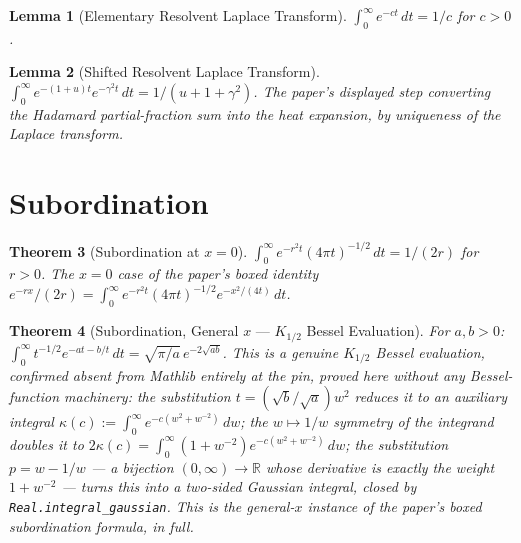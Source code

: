 \documentclass{report}
\newtheorem{theorem}{Theorem}[chapter]
\newtheorem{lemma}[theorem]{Lemma}
\theoremstyle{definition}
\begin{document}
\begin{lemma}[Elementary Resolvent Laplace Transform]
  \label{lem:resolvent-laplace}
  \leanok
  $\int_0^\infty e^{-ct}\,dt = 1/c$ for $c>0$.
\end{lemma}

\begin{lemma}[Shifted Resolvent Laplace Transform]
  \label{lem:laplace-resolvent-shift}
  \leanok
  $\int_0^\infty e^{-(1+u)t}e^{-\gamma^2 t}\,dt = 1/(u+1+\gamma^2)$. The paper's displayed
  step converting the Hadamard partial-fraction sum into the heat expansion, by uniqueness
  of the Laplace transform.
\end{lemma}

\section{Subordination}

\begin{theorem}[Subordination at $x=0$]
  \label{thm:subordination-at-zero}
  \leanok
  $\int_0^\infty e^{-r^2t}(4\pi t)^{-1/2}\,dt = 1/(2r)$ for $r>0$. The $x=0$ case of the
  paper's boxed identity $e^{-rx}/(2r) = \int_0^\infty e^{-r^2t}(4\pi t)^{-1/2}e^{-x^2/(4t)}\,dt$.
\end{theorem}

\begin{theorem}[Subordination, General $x$ --- $K_{1/2}$ Bessel Evaluation]
  \label{thm:subordination-general}
  \leanok
  For $a,b>0$: $\int_0^\infty t^{-1/2}e^{-at-b/t}\,dt = \sqrt{\pi/a}\,e^{-2\sqrt{ab}}$. This
  is a genuine $K_{1/2}$ Bessel evaluation, confirmed absent from Mathlib entirely at the
  pin, proved here \emph{without any Bessel-function machinery}: the substitution
  $t=(\sqrt{b}/\sqrt{a})w^2$ reduces it to an auxiliary integral
  $\kappa(c) := \int_0^\infty e^{-c(w^2+w^{-2})}\,dw$; the $w\mapsto 1/w$ symmetry of the
  integrand doubles it to $2\kappa(c)=\int_0^\infty(1+w^{-2})e^{-c(w^2+w^{-2})}\,dw$; the
  substitution $p=w-1/w$ --- a bijection $(0,\infty)\to\mathbb{R}$ whose derivative is
  exactly the weight $1+w^{-2}$ --- turns this into a two-sided Gaussian integral, closed by
  \texttt{Real.integral\_gaussian}. This is the general-$x$ instance of the paper's boxed
  subordination formula, in full.
\end{theorem}
\end{document}
